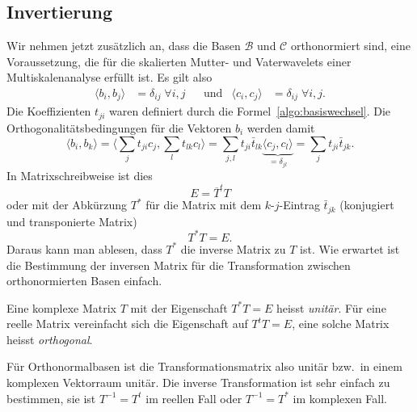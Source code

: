 \subsection{Invertierung}
Wir nehmen jetzt zusätzlich an, dass die Basen $\mathcal{B}$ und $\mathcal{C}$
orthonormiert sind, eine Voraussetzung, die für die skalierten Mutter- und
Vaterwavelets einer Multiskalenanalyse erfüllt ist.
Es gilt also
\[
\begin{aligned}
\langle b_i,b_j\rangle &=\delta_{ij}\;\forall i,j
&&\text{und}
&
\langle c_i,c_j\rangle &=\delta_{ij}\;\forall i,j.
\end{aligned}
\]
Die Koeffizienten $t_{ji}$ waren definiert durch die
Formel~\eqref{algo:basiswechsel}.
Die Orthogonalitätsbedingungen für die Vektoren $b_i$ werden damit
\[
\langle b_i,b_k\rangle
=
\biggl\langle
\sum_{j}t_{ji}c_j,\sum_{l}t_{lk}c_l
\biggr\rangle
=
\sum_{j,l} t_{ji}\bar{t}_{lk}
\underbrace{\langle c_j,c_l\rangle}_{\displaystyle=\delta_{jl}}
=
\sum_{j} t_{ji}\bar{t}_{jk}.
\]
In Matrixschreibweise ist dies
\[
E
=
\overline{T}^tT
\]
oder mit der Abkürzung $T^*$ für die Matrix mit dem $k$-$j$-Eintrag
$\bar{t}_{jk}$ (konjugiert und transponierte Matrix) 
\[
T^*T=E.
\]
Daraus kann man ablesen, dass $T^*$ die inverse Matrix zu $T$ ist.
Wie erwartet ist die Bestimmung der inversen Matrix für die Transformation 
zwischen orthonormierten Basen einfach.
\begin{definition}
Eine komplexe Matrix $T$ mit der Eigenschaft $T^*T=E$ heisst {\em unitär}.
Für eine reelle Matrix vereinfacht sich die Eigenschaft auf $T^tT=E$, eine
solche Matrix heisst {\em orthogonal}.
%
%
\end{definition}
Für Orthonormalbasen ist die Transformationsmatrix also unitär bzw.~in
einem komplexen Vektorraum unitär.
Die inverse Transformation ist sehr einfach zu bestimmen, sie ist $T^{-1}=T^t$
im reellen Fall oder $T^{-1}=T^*$ im komplexen Fall.

